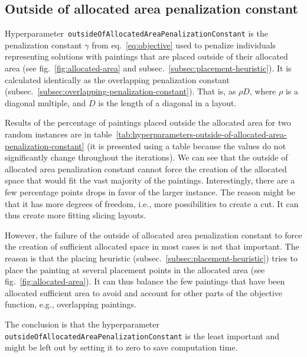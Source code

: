 \subsection{Outside of allocated area penalization constant}\label{subsec:outside-of-allocated-area-penalization-constant}
Hyperparameter~\verb|outsideOfAllocatedAreaPenalizationConstant| is the penalization constant $\gamma$ from eq.~\ref{eq:objective} used to penalize
individuals representing solutions with paintings that are placed outside of their allocated area (see fig.~\ref{fig:allocated-area} and subsec.~\ref{subsec:placement-heuristic}).
It is calculated identically as the overlapping penalization constant (subsec.~\ref{subsec:overlapping-penalization-constant}).
That is, as $\rho D$, where $\rho$ is a diagonal multiple, and $D$ is the length of a diagonal in a layout.

Results of the percentage of paintings placed outside the allocated area for two random instances are in table~\ref{tab:hyperparameters-outside-of-allocated-area-penalization-constant}
(it is presented using a table because the values do not significantly change throughout the iterations).
We can see that the outside of allocated area penalization constant cannot force the creation of the allocated space that would fit the vast majority of the paintings.
Interestingly, there are a few percentage points drops in favor of the larger instance.
The reason might be that it has more degrees of freedom, i.e.,  more possibilities to create a cut.
It can thus create more fitting slicing layouts.

However, the failure of the outside of allocated area penalization constant to force
the creation of sufficient allocated space in most cases is not that important.
The reason is that the placing heuristic (subsec.~\ref{subsec:placement-heuristic})
tries to place the painting at several placement points in the allocated area (see fig.~\ref{fig:allocated-area}).
It can thus balance the few paintings that have been allocated sufficient area to avoid
and account for other parts of the objective function, e.g., overlapping paintings.

The conclusion is that the hyperparameter \verb|outsideOfAllocatedAreaPenalizationConstant| is the least
important and might be left out by setting it to zero to save computation time.


